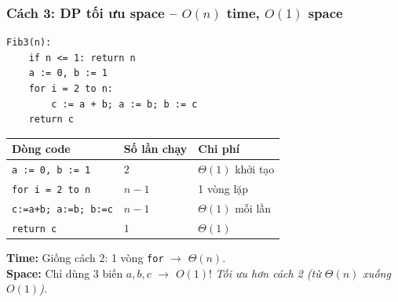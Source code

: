 \documentclass[10pt]{article}
\begin{document}
\subsubsection{\texorpdfstring{Cách 3: DP tối ưu space -- \(O(n)\) time,
\(O(1)\)
space}{Cách 3: DP tối ưu space -- O(n) time, O(1) space}}\label{cuxe1ch-3-dp-tux1ed1i-ux1b0u-space-on-time-o1-space}

\begin{tcolorbox}[colback=gray!8, colframe=gray!50, boxrule=0.5pt, arc=2pt,
  left=6pt, right=6pt, top=4pt, bottom=4pt,
  title={\small\textbf{Pseudocode 3: Fibonacci -- DP tối ưu space}}]
\begin{verbatim}
Fib3(n):
    if n <= 1: return n
    a := 0, b := 1
    for i = 2 to n:
        c := a + b; a := b; b := c
    return c
\end{verbatim}
\end{tcolorbox}

\begin{tcolorbox}[colback=yellow!5, colframe=orange!50, boxrule=0.5pt, arc=2pt, title={\small\textbf{Phân tích Complexity -- Fibonacci DP tối ưu space}}]
\begin{tabular}{|l|l|l|}
\hline
\textbf{Dòng code} & \textbf{Số lần chạy} & \textbf{Chi phí} \\
\hline
\texttt{a := 0, b := 1} & $2$ & $\Theta(1)$ khởi tạo \\
\hline
\texttt{for i = 2 to n} & $n-1$ & 1 vòng lặp \\
\hline
\quad \texttt{c:=a+b; a:=b; b:=c} & $n-1$ & $\Theta(1)$ mỗi lần \\
\hline
\texttt{return c} & $1$ & $\Theta(1)$ \\
\hline
\end{tabular}
\vspace{0.2cm}

\textbf{Time:} Giống cách 2: 1 vòng \texttt{for} $\to$ $\Theta(n)$.\\
\textbf{Space:} Chỉ dùng 3 biến $a, b, c$ $\to$ $O(1)$! \textit{Tối ưu hơn cách 2 (từ $\Theta(n)$ xuống $O(1)$).}
\end{tcolorbox}
\end{document}

